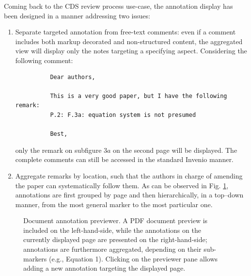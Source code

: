 Coming back to the CDS review process use-case, the annotation display has been
designed in a manner addressing two issues:
\begin{enumerate}
  \item Separate targeted annotation from free-text comments: even if a comment
        includes both markup decorated and non-structured content, the
        aggregated view will display only the notes targeting a specifying
        aspect. Considering the following comment:
        \begin{verbatim}
          Dear authors,

          This is a very good paper, but I have the following remark:
          P.2: F.3a: equation system is not presumed

          Best,
        \end{verbatim}
        only the remark on subfigure $3a$ on the second page will be displayed.
        The complete comments can still be accessed in the standard Invenio
        manner.
  \item Aggregate remarks by location, such that the authors in charge of
        amending the paper can systematically follow them. As can be observed in
        Fig. \ref{fig:noteview}, annotations are first grouped by page and then
        hierarchically, in a top--down manner, from the most general marker to
        the most particular one.
\end{enumerate}

\begin{figure}[!ht]
  \centering
  \caption[Document annotation previewer]
          {Document annotation previewer. A PDF document preview is included on
           the left-hand-side, while the annotations on the currently displayed
           page are presented on the right-hand-side; annotations are
           furthermore aggregated, depending on their sub-markers (e.g.,
           Equation 1). Clicking on the previewer pane allows adding a new
           annotation targeting the displayed page.}
  \label{fig:noteview}
\end{figure}

